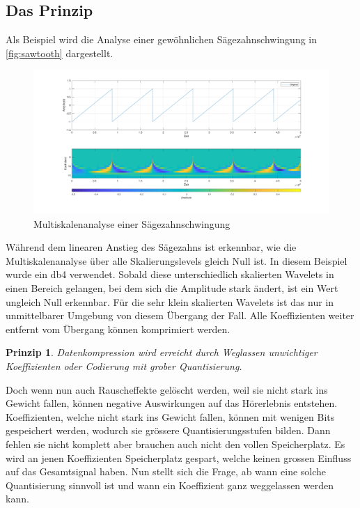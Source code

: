 \begin{refsection}
\subsection{Das Prinzip}
Als Beispiel wird die Analyse einer gewöhnlichen Sägezahnschwingung in \autoref{fig:sawtooth} dargestellt.
%
\begin{figure}
	\centering
	\includegraphics[width=\linewidth]{papers/compress/Bilder/sawtooth}
	\caption{Multiskalenanalyse einer Sägezahnschwingung}
	\label{fig:sawtooth}
\end{figure}
Während dem linearen Anstieg des Sägezahns ist erkennbar, wie die Multiskalenanalyse über alle Skalierungslevels gleich Null ist.
In diesem Beispiel wurde ein db4 verwendet.
Sobald diese unterschiedlich skalierten Wavelets in einen Bereich gelangen, bei dem sich die Amplitude stark ändert, ist ein Wert ungleich Null erkennbar.
Für die sehr klein skalierten Wavelets ist das nur in unmittelbarer Umgebung von diesem Übergang der Fall.
Alle Koeffizienten weiter entfernt vom Übergang können komprimiert werden.

\newtheorem*{Prinzip}{Prinzip}
\begin{Prinzip}
	Datenkompression wird erreicht durch Weglassen unwichtiger Koeffizienten oder Codierung mit grober Quantisierung.
\end{Prinzip}
%

Doch wenn nun auch Rauscheffekte gelöscht werden, weil sie nicht stark ins Gewicht fallen, können negative Auswirkungen auf das Hörerlebnis entstehen. 
Koeffizienten, welche nicht stark ins Gewicht fallen, können mit wenigen Bits gespeichert werden, wodurch sie grössere Quantisierungsstufen bilden. 
Dann fehlen sie nicht komplett aber brauchen auch nicht den vollen Speicherplatz.
Es wird an jenen Koeffizienten Speicherplatz gespart, welche keinen grossen Einfluss auf das Gesamtsignal haben.
Nun stellt sich die Frage, ab wann eine solche Quantisierung sinnvoll ist und wann ein Koeffizient ganz weggelassen werden kann.


\end{refsection}
